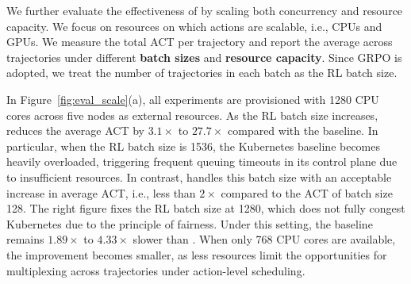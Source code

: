 

We further evaluate the effectiveness of \sysname by scaling both concurrency and resource capacity.
We focus on resources on which actions are scalable, i.e., CPUs and GPUs.
We measure the total ACT per trajectory and report the average across trajectories under different \textbf{batch sizes} and \textbf{resource capacity}. 
Since GRPO is adopted, we treat the number of trajectories in each batch as the RL batch size.

In Figure~\ref{fig:eval_scale}(a), all experiments are provisioned with 1280 CPU cores across five nodes as external resources. As the RL batch size increases, \sysname reduces the average ACT by $3.1\times$ to $27.7\times$ compared with the baseline.
In particular, when the RL batch size is 1536, the Kubernetes baseline becomes heavily overloaded, triggering frequent queuing timeouts in its control plane due to insufficient resources.
In contrast, \sysname handles this batch size with an acceptable increase in average ACT, i.e., less than $2\times$ compared to the ACT of batch size 128.
The right figure fixes the RL batch size at 1280, which does not fully congest Kubernetes due to the principle of fairness. Under this setting, the baseline remains $1.89\times$ to $4.33\times$ slower than \sysname.
When only 768 CPU cores are available, the improvement becomes smaller, as less resources limit the opportunities for multiplexing across trajectories under action-level scheduling.

